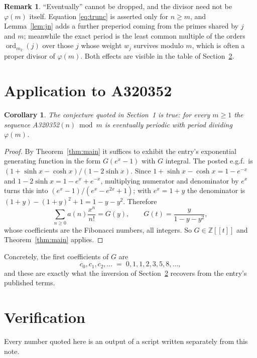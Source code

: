 \documentclass[11pt,a4paper]{article}
\theoremstyle{plain}
\newtheorem{corollary}[theorem]{Corollary}
\theoremstyle{definition}
\newtheorem{remark}[theorem]{Remark}
\newcommand{\ord}{\operatorname{ord}}
\newcommand{\Z}{\mathbb{Z}}
\begin{document}
\begin{remark}
``Eventually'' cannot be dropped, and the divisor need not be $\varphi(m)$ itself.
Equation \eqref{eq:trunc} is asserted only for $n\ge m$, and Lemma~\ref{lem:jn} adds a
further preperiod coming from the primes shared by $j$ and $m$; meanwhile the exact period
is the least common multiple of the orders $\ord_{m_{2}}(j)$ over those $j$ whose weight
$w_{j}$ survives modulo $m$, which is often a proper divisor of $\varphi(m)$. Both effects
are visible in the table of Section~\ref{sec:ver}.
\end{remark}

\section{Application to A320352}\label{sec:apply}

\begin{corollary}\label{cor:this}
The conjecture quoted in Section~1 is true: for every $m\ge1$ the sequence
A320352$(n) \bmod m$ is eventually periodic with period dividing $\varphi(m)$.
\end{corollary}

\begin{proof}
By Theorem~\ref{thm:main} it suffices to exhibit the entry's exponential generating
function in the form $G(e^{x}-1)$ with $G$ integral. The posted e.g.f.\ is $(1+\sinh x-\cosh x)/(1-2\sinh x)$. Since $1+\sinh x-\cosh x=1-e^{-x}$ and $1-2\sinh x=1-e^{x}+e^{-x}$, multiplying numerator and denominator by $e^{x}$ turns this into $(e^{x}-1)/(e^{x}-e^{2x}+1)$; with $e^{x}=1+y$ the denominator is $(1+y)-(1+y)^{2}+1=1-y-y^{2}$. Therefore
\[
\sum_{n\ge0}a(n)\frac{x^{n}}{n!}=G(y),\qquad G(t)=\frac{y}{1-y-y^{2}} ,
\]
whose coefficients are the Fibonacci numbers, all integers. So $G\in\Z[[t]]$ and
Theorem~\ref{thm:main} applies.
\end{proof}

Concretely, the first coefficients of $G$ are
\[
c_{0},c_{1},c_{2},\dots \;=\; 0, 1, 1, 2, 3, 5, 8, \dots ,
\]
and these are exactly what the inversion of Section~\ref{sec:ver} recovers from the
entry's published terms.

\section{Verification}\label{sec:ver}

Every number quoted here is an output of a script written separately from this note.
\end{document}
